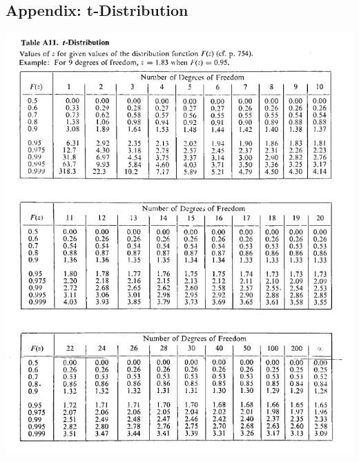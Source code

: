 \documentclass{article}
\begin{document}
\begin{appendices}
\section*{Appendix: t-Distribution}
\includegraphics[width=\textwidth]{t_distribution_Table_lecture3.png}


\end{appendices}
\end{document}
